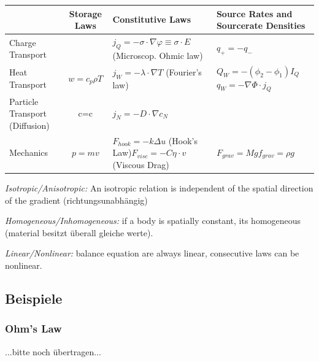 \documentclass[a4paper, 10pt]{scrartcl}
\begin{document}
		\begin{tabularx}{\linewidth}{Xcp{4cm}X}
			\toprule
			& Storage Laws & Constitutive Laws & Source Rates and Sourcerate Densities \\ \midrule
			Charge Transport & & $j_Q=-\sigma \cdot \nabla\varphi \equiv \sigma \cdot E$ (Microscop. Ohmic law) & $q_+ = - q_-$ \\
			Heat Transport & $w=c_p \rho T$ & $j_W=-\lambda \cdot \nabla T$  (Fourier's law)& $Q_W = -(\phi_2-\phi_1)I_Q$\newline $q_W = -\nabla\Phi\cdot j_Q$  \\ 
			Particle Transport (Diffusion) & c=c & $j_N=- D \cdot \nabla c_N$ &  \\ 
			Mechanics & $p=mv$ & $F_{hook} = - k \Delta u$ (Hook's Law)\newline $F_{visc}=-C \eta \cdot v$ (Viscous Drag) & $F_{grav} = M g$\newline $f_{grav}=\rho g$ \\ 
			\bottomrule
		\end{tabularx} 
		\begin{multicols}{2}
			\emph{Isotropic/Anisotropic:} An isotropic relation is independent of the spatial direction of the gradient (richtungsunabhängig)
			
			\columnbreak
			
			\emph{Homogeneous/Inhomogeneous:}
			if a body is spatially constant, its homogeneous (material besitzt überall gleiche werte).
			
			\emph{Linear/Nonlinear:} balance equation are always linear, consecutive laws can be nonlinear. 
			
		\end{multicols}
		\subsection{Beispiele}
		\subsubsection{Ohm's Law}
		...bitte noch übertragen...
\end{document}

